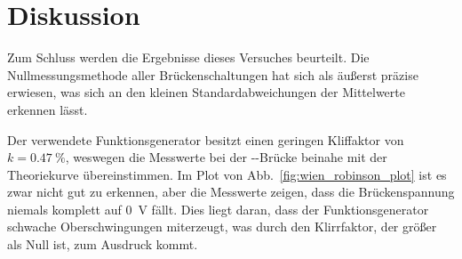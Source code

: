 
\section{Diskussion}
Zum Schluss werden die Ergebnisse dieses Versuches beurteilt.
Die Nullmessungsmethode aller Brückenschaltungen hat sich als äußerst
präzise erwiesen, was sich an den kleinen Standardabweichungen der
Mittelwerte erkennen lässt.

Der verwendete Funktionsgenerator besitzt einen geringen Kliffaktor von
$k = \SI{0.47}{\percent}$, weswegen die Messwerte bei der
--Brücke beinahe mit der Theoriekurve
übereinstimmen. Im Plot von Abb.~\ref{fig:wien_robinson_plot} ist es zwar 
nicht gut zu erkennen, aber die Messwerte zeigen, dass die 
Brückenspannung niemals komplett auf \SI{0}{\volt} fällt. Dies liegt 
daran, dass der Funktionsgenerator schwache Oberschwingungen
miterzeugt, was durch den Klirrfaktor, der größer als Null ist, zum
Ausdruck kommt.
